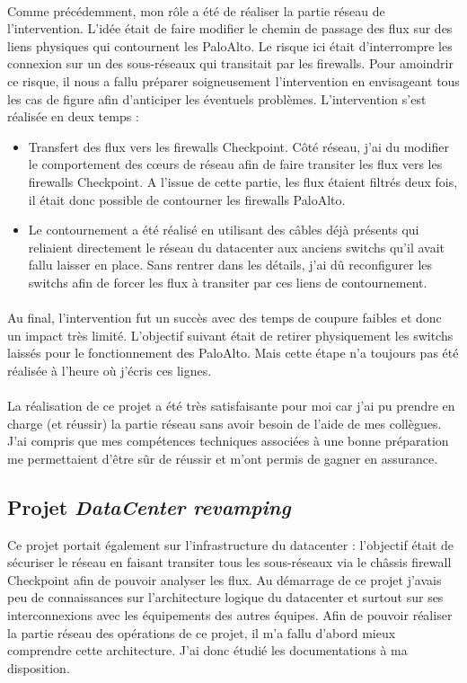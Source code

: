 \documentclass[a4paper,12pt]{report}
\begin{document}
\paragraph{}
Comme précédemment, mon rôle a été de réaliser la partie réseau de l'intervention. L'idée était de faire modifier le chemin de passage des flux sur des liens physiques qui contournent les PaloAlto. Le risque ici était d'interrompre les connexion sur un des sous-réseaux qui transitait par les firewalls. Pour amoindrir ce risque, il nous a fallu préparer soigneusement l'intervention en envisageant tous les cas de figure afin d'anticiper les éventuels problèmes. L'intervention s'est réalisée en deux temps : 
\begin{itemize}
\item
Transfert des flux vers les firewalls Checkpoint. Côté réseau, j'ai du modifier le comportement des cœurs de réseau afin de faire transiter les flux vers les firewalls Checkpoint. A l'issue de cette partie, les flux étaient filtrés deux fois, il était donc possible de contourner les firewalls PaloAlto.
\item
Le contournement a été réalisé en utilisant des câbles déjà présents qui reliaient directement le réseau du datacenter aux anciens switchs qu'il avait fallu laisser en place. Sans rentrer dans les détails, j'ai dû reconfigurer les switchs afin de forcer les flux à transiter par ces liens de contournement.
\end{itemize}
\paragraph{}
Au final, l'intervention fut un succès avec des temps de coupure faibles et donc un impact très limité. L'objectif suivant était de retirer physiquement les switchs laissés pour le fonctionnement des PaloAlto. Mais cette étape n'a toujours pas été réalisée à l'heure où j'écris ces lignes. 
\paragraph{}
La réalisation de ce projet a été très satisfaisante pour moi car j'ai pu prendre en charge (et réussir) la partie réseau sans avoir besoin de l'aide de mes collègues. J'ai compris que mes compétences techniques associées à une bonne préparation me permettaient d'être sûr de réussir et m'ont permis de gagner en assurance.

\subsection{Projet \textit{DataCenter revamping}} \label{revamp}
Ce projet portait également sur l'infrastructure du datacenter : l'objectif était de sécuriser le réseau en faisant transiter tous les sous-réseaux via le châssis firewall Checkpoint afin de pouvoir analyser les flux. Au démarrage de ce projet j'avais peu de connaissances sur l'architecture logique du datacenter et surtout sur ses interconnexions avec les équipements des autres équipes. Afin de pouvoir réaliser la partie réseau des opérations de ce projet, il m'a fallu d'abord mieux comprendre cette architecture. J'ai donc étudié les documentations à ma disposition.
\end{document}
